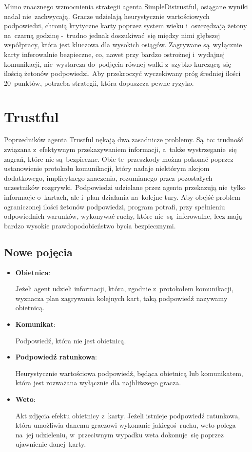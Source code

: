 \documentclass[declaration,shortabstract,inz]{iithesis}
\begin{document}
Mimo znacznego wzmocnienia strategii agenta SimpleDistrustful, osiągane wyniki nadal nie~zachwycają. Gracze udzielają heurystycznie wartościowych podpowiedzi, chronią krytyczne karty poprzez system wieku i~oszczędzają żetony na~czarną godzinę -~trudno jednak doszukiwać~się między nimi głębszej współpracy, która jest kluczowa dla wysokich osiągów. Zagrywane są~wyłącznie karty inferowalnie bezpieczne, co, nawet przy bardzo ostrożnej i~wydajnej komunikacji, nie~wystarcza do~podjęcia równej walki z~szybko kurczącą~się ilością żetonów podpowiedzi. Aby przekroczyć wyczekiwany próg średniej ilości 20~punktów, potrzeba strategii, która dopuszcza pewne ryzyko.

\section{Trustful}

Poprzedników agenta Trustful nękają dwa zasadnicze problemy. Są~to: trudność związana z~efektywnym przekazywaniem informacji, a~także wystrzeganie~się zagrań, które nie są~bezpieczne. Obie te~przeszkody można pokonać poprzez ustanowienie protokołu komunikacji, który nadaje niektórym akcjom dodatkowego, implicytnego znaczenia, rozumianego przez pozostałych uczestników rozgrywki. Podpowiedzi udzielane przez agenta przekazują nie~tylko informacje o~kartach, ale i~plan działania na~kolejne tury. Aby obejść problem ograniczonej ilości żetonów podpowiedzi, program potrafi, przy spełnieniu odpowiednich warunków, wykonywać ruchy, które nie~są~inferowalne, lecz mają bardzo wysokie prawdopodobieństwo bycia bezpiecznymi.

\subsection*{Nowe pojęcia}

\begin{itemize}
	\item \textbf{Obietnica}:
	
	Jeżeli agent udzieli informacji, która, zgodnie z~protokołem komunikacji, wyznacza plan zagrywania kolejnych kart, taką podpowiedź nazywamy obietnicą.
	
	\item \textbf{Komunikat}:
	
	Podpowiedź, która nie jest obietnicą.
	
	\item \textbf{Podpowiedź ratunkowa}:
	
	Heurystycznie wartościowa podpowiedź, będąca obietnicą lub komunikatem, która jest rozważana wyłącznie dla najbliższego gracza.
	
	\item \textbf{Weto}:
	
	Akt zdjęcia efektu obietnicy z~karty. Jeżeli istnieje podpowiedź ratunkowa, która umożliwia danemu graczowi wykonanie jakiegoś ruchu, weto polega na~jej udzieleniu, w~przeciwnym wypadku weta dokonuje~się poprzez ujawnienie danej karty.

\end{itemize}
\end{document}
